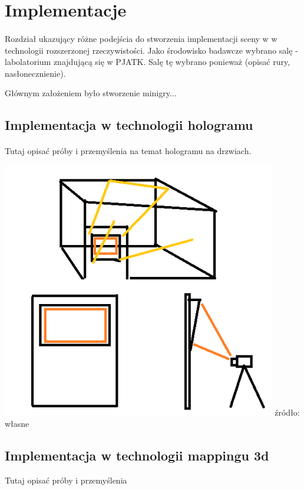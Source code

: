 \section{Implementacje}
\paragraph{}
Rozdział ukazujący różne podejścia do stworzenia implementacji sceny w w technologii rozszerzonej rzeczywistości.
Jako środowisko badawcze wybrano salę - labolatorium znajdującą się w PJATK. Salę tę wybrano ponieważ (opisać rury, nasłonecznienie).


Głównym założeniem było stworzenie minigry...

\subsection{Implementacja w technologii hologramu}
\paragraph{}
{\color{red}Tutaj opisać próby i przemyślenia na temat hologramu na drzwiach.}
\begin{center}
\includegraphics[width=0.9\textwidth]{images/hologramv1.png}
\small {źródło: własne }
\end{center}

\subsection{Implementacja w technologii mappingu 3d}
{\color{red}Tutaj opisać próby i przemyślenia}